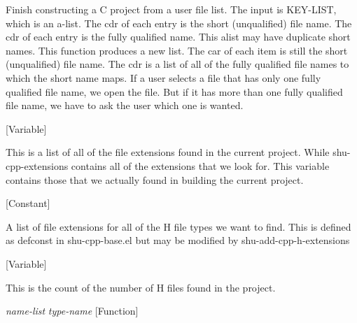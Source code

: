 \begin{doc-string}
Finish constructing a C project from a user file list.  The input is
KEY-LIST, which is an a-list.  The cdr of each entry is the short (unqualified)
file name.  The cdr of each entry is the fully qualified name.  This alist may
have duplicate short names.  This function produces a new list.  The car of each
item is still the short (unqualified) file name.  The cdr is a list of all of
the fully qualified file names to which the short name maps.  If a user selects
a file that has only one fully qualified file name, we open the file.  But if it
has more than one fully qualified file name, we have to ask the user which one
is wanted.
\end{doc-string}

\vspace{1em}
\noindent
{}
\usebox{\funcname}
 \hfill [Variable]

\begin{doc-string}
This is a list of all of the file extensions found in the current project.  While
shu-cpp-extensions contains all of the extensions that we look for.  This variable
contains those that we actually found in building the current project.
\end{doc-string}

\vspace{1em}
\noindent
{}
\usebox{\funcname}
 \hfill [Constant]

\begin{doc-string}
A list of file extensions for all of the H file types we want to find.  This is defined
as defconst in shu-cpp-base.el but may be modified by shu-add-cpp-h-extensions
\end{doc-string}

\vspace{1em}
\noindent
{}
\usebox{\funcname}
 \hfill [Variable]

\begin{doc-string}
This is the count of the number of H files found in the project.
\end{doc-string}

\vspace{1em}
\noindent
{}
\usebox{\funcname}\emph{name-list} \emph{type-name}
 \hfill [Function]

